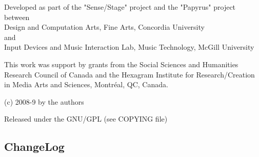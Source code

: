 \documentclass[letterpaper,10pt]{article}
\begin{document}
Developed as part of the "Sense/Stage" project and the "Papyrus" project between\\
Design and Computation Arts, Fine Arts, Concordia University\\
and\\
Input Devices and Music Interaction Lab, Music Technology, McGill University

This work was support by grants from the Social Sciences and Humanities Research Council of Canada and the Hexagram Institute for Research/Creation in Media Arts and Sciences, Montr\'eal, QC, Canada.

(c) 2008-9 by the authors

Released under the GNU/GPL (see COPYING file)

\subsection*{ChangeLog}
\end{document}

